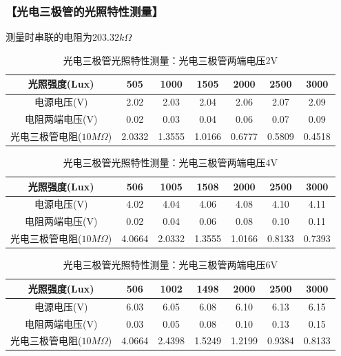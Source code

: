 \documentclass{ctexart}
\let\oldsubsubsection\subsubsection
\renewcommand{\subsubsection}[1]{\oldsubsubsection{\!\!\!\!\!\!【#1】}}
\begin{document}
\newpage
\subsubsection{光电三极管的光照特性测量}

测量时串联的电阻为$203.32k\Omega$

\begin{table}[H]
  \centering
  \begin{tabular}{|c|c|c|c|c|c|c|}
    \hline
    光照强度(Lux) &505&1000&1505&2000&2500&3000\\\hline
    电源电压(V) &2.02&2.03&2.04&2.06&2.07&2.09\\\hline
    电阻两端电压(V) &0.02&0.03&0.04&0.06&0.07&0.09\\\hline
    光电三极管电阻($10M\Omega$) &2.0332&1.3555&1.0166&0.6777&0.5809&0.4518 \\\hline
  \end{tabular}
  \caption{光电三极管光照特性测量：光电三极管两端电压2V}
\end{table}

\begin{table}[H]
  \centering
  \begin{tabular}{|c|c|c|c|c|c|c|}
    \hline
    光照强度(Lux) &506&1005&1508&2000&2500&3000\\\hline
    电源电压(V) &4.02&4.04&4.06&4.08&4.10&4.11\\\hline
    电阻两端电压(V) &0.02&0.04&0.06&0.08&0.10&0.11\\\hline
    光电三极管电阻($10M\Omega$) &4.0664&2.0332&1.3555&1.0166&0.8133&0.7393 \\\hline
  \end{tabular}
  \caption{光电三极管光照特性测量：光电三极管两端电压4V}
\end{table}

\begin{table}[H]
  \centering
  \begin{tabular}{|c|c|c|c|c|c|c|}
    \hline
    光照强度(Lux) &506&1002&1498&2000&2500&3000\\\hline
    电源电压(V) &6.03&6.05&6.08&6.10&6.13&6.15\\\hline
    电阻两端电压(V) &0.03&0.05&0.08&0.10&0.13&0.15\\\hline
    光电三极管电阻($10M\Omega$) &4.0664&2.4398&1.5249&1.2199&0.9384&0.8133 \\\hline
  \end{tabular}
  \caption{光电三极管光照特性测量：光电三极管两端电压6V}
\end{table}
\end{document}
